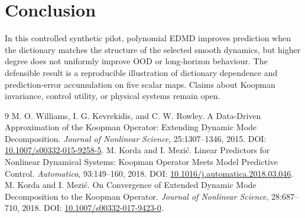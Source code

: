 \documentclass[11pt]{article}
\begin{document}
\section{Conclusion}
In this controlled synthetic pilot, polynomial EDMD improves prediction when the dictionary matches the structure of the selected smooth dynamics, but higher degree does not uniformly improve OOD or long-horizon behaviour. The defensible result is a reproducible illustration of dictionary dependence and prediction-error accumulation on five scalar maps. Claims about Koopman invariance, control utility, or physical systems remain open.

\begin{thebibliography}{9}
 M. O. Williams, I. G. Kevrekidis, and C. W. Rowley. A Data-Driven Approximation of the Koopman Operator: Extending Dynamic Mode Decomposition. \textit{Journal of Nonlinear Science}, 25:1307--1346, 2015. DOI: \href{https://doi.org/10.1007/s00332-015-9258-5}{10.1007/s00332-015-9258-5}.
 M. Korda and I. Mezić. Linear Predictors for Nonlinear Dynamical Systems: Koopman Operator Meets Model Predictive Control. \textit{Automatica}, 93:149--160, 2018. DOI: \href{https://doi.org/10.1016/j.automatica.2018.03.046}{10.1016/j.automatica.2018.03.046}.
 M. Korda and I. Mezić. On Convergence of Extended Dynamic Mode Decomposition to the Koopman Operator. \textit{Journal of Nonlinear Science}, 28:687--710, 2018. DOI: \href{https://doi.org/10.1007/s00332-017-9423-0}{10.1007/s00332-017-9423-0}.
\end{thebibliography}
\end{document}
